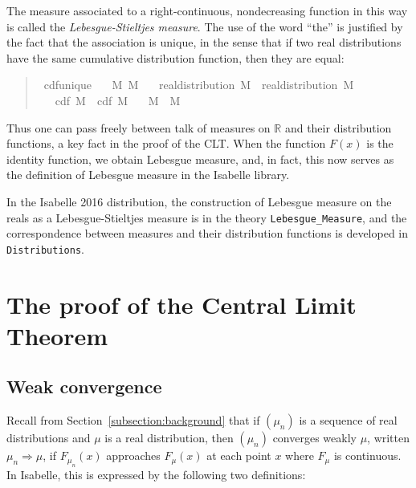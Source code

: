 \documentclass{svjour3}
\newcommand{\RR}{\mathbb{R}}
\begin{document}
The measure associated to a right-continuous, nondecreasing function in this way is called the \emph{Lebesgue-Stieltjes measure}. The use of the word ``the'' is justified by the fact that the association is unique, in the sense that if two real distributions have the same cumulative distribution function, then they are equal: 
\begin{quote}
\begin{isabellebody}
\isamarkupfalse%
\ cdf{\isacharunderscore}unique{\isacharcolon}\isanewline
\ \ \ M{}\ M{}\isanewline
\ \ \ {\isachardoublequoteopen}real{\isacharunderscore}distribution\ M{}{\isachardoublequoteclose}\ \ {\isachardoublequoteopen}real{\isacharunderscore}distribution\ M{}{\isachardoublequoteclose}\isanewline
\ \ \ {\isachardoublequoteopen}cdf\ M{}\ {\isacharequal}\ cdf\ M{}{\isachardoublequoteclose}\isanewline
\ \ \ {\isachardoublequoteopen}M{}\ {\isacharequal}\ M{}{\isachardoublequoteclose}
\end{isabellebody}
\end{quote}
Thus one can pass freely between talk of measures on $\RR$ and their distribution functions, a key fact in the proof of the CLT. When the function $F(x)$ is the identity function, we obtain Lebesgue measure, and, in fact, this now serves as the definition of Lebesgue measure in the Isabelle library.

In the Isabelle 2016 distribution, the construction of Lebesgue measure on the reals as a Lebesgue-Stieltjes measure is in the theory \verb=Lebesgue_Measure=, and the correspondence between measures and their distribution functions is developed in \verb=Distributions=.

\section{The proof of the Central Limit Theorem}
\label{section:formal}

\subsection{Weak convergence}
\label{subsection:weak:convergence}

Recall from Section~\ref{subsection:background} that if $(\mu_n)$ is a sequence of real distributions and $\mu$ is a real distribution, then $(\mu_n)$ converges weakly $\mu$, written $\mu_n \Rightarrow \mu$, if $F_{\mu_n}(x)$ approaches $F_\mu(x)$ at each point $x$ where $F_\mu$ is continuous. In Isabelle, this is expressed by the following two definitions:
\end{document}
